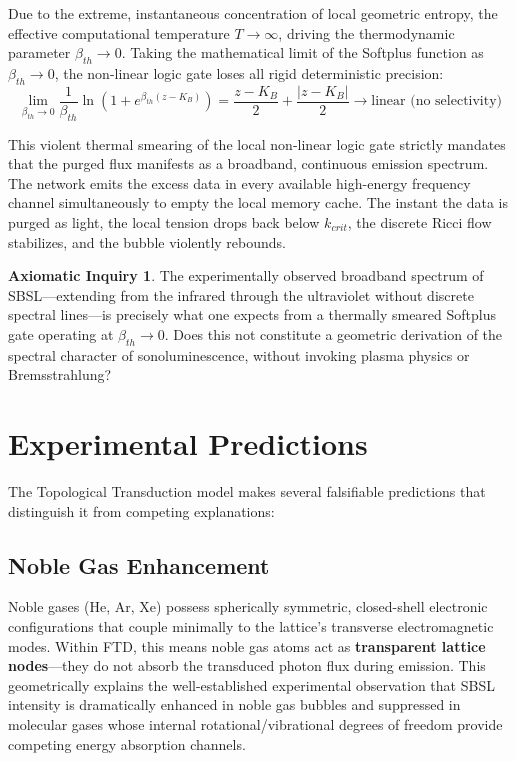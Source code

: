 \documentclass[11pt, letterpaper]{article}
\theoremstyle{definition}
\newtheorem{inquiry}{Axiomatic Inquiry}[section]
\theoremstyle{remark}
\begin{document}
Due to the extreme, instantaneous concentration of local geometric entropy, the effective computational temperature $T \to \infty$, driving the thermodynamic parameter $\beta_{th} \to 0$. Taking the mathematical limit of the Softplus function as $\beta_{th} \to 0$, the non-linear logic gate loses all rigid deterministic precision:
\begin{equation}
    \lim_{\beta_{th} \to 0} \frac{1}{\beta_{th}} \ln\left(1 + e^{\beta_{th}(z - K_B)}\right) = \frac{z - K_B}{2} + \frac{|z - K_B|}{2} \to \text{linear (no selectivity)}
\end{equation}

This violent thermal smearing of the local non-linear logic gate strictly mandates that the purged flux manifests as a broadband, continuous emission spectrum. The network emits the excess data in every available high-energy frequency channel simultaneously to empty the local memory cache. The instant the data is purged as light, the local tension drops back below $k_{crit}$, the discrete Ricci flow stabilizes, and the bubble violently rebounds.

\begin{inquiry}
The experimentally observed broadband spectrum of SBSL---extending from the infrared through the ultraviolet without discrete spectral lines---is precisely what one expects from a thermally smeared Softplus gate operating at $\beta_{th} \to 0$. Does this not constitute a geometric derivation of the spectral character of sonoluminescence, without invoking plasma physics or Bremsstrahlung?
\end{inquiry}

\section{Experimental Predictions}

The Topological Transduction model makes several falsifiable predictions that distinguish it from competing explanations:

\subsection{Noble Gas Enhancement}
Noble gases (He, Ar, Xe) possess spherically symmetric, closed-shell electronic configurations that couple minimally to the lattice's transverse electromagnetic modes. Within FTD, this means noble gas atoms act as \textbf{transparent lattice nodes}---they do not absorb the transduced photon flux during emission. This geometrically explains the well-established experimental observation that SBSL intensity is dramatically enhanced in noble gas bubbles \cite{Barber1997} and suppressed in molecular gases whose internal rotational/vibrational degrees of freedom provide competing energy absorption channels.
\end{document}
